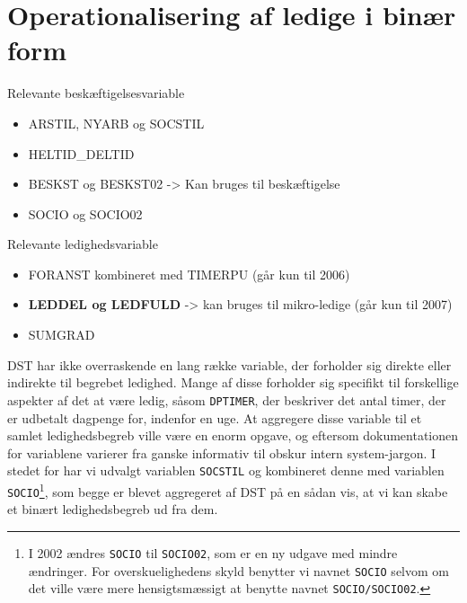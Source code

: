 \section{Operationalisering af ledige i binær form \label{ledig_operationalisering}} 
% 
Relevante beskæftigelsesvariable
 \begin{itemize} [topsep=6pt,itemsep=-1ex]
   \item ARSTIL, NYARB og SOCSTIL
   \item HELTID\_DELTID
   \item BESKST og BESKST02 -> Kan bruges til beskæftigelse
   \item SOCIO og SOCIO02
 \end{itemize}
% 
Relevante ledighedsvariable
 \begin{itemize} [topsep=6pt,itemsep=-1ex]
   \item FORANST kombineret med TIMERPU (går kun til 2006)
   \item \textbf{LEDDEL og LEDFULD} -> kan bruges til mikro-ledige (går kun til 2007)
   \item SUMGRAD
 \end{itemize}
% 


DST har ikke overraskende en lang række variable, der forholder sig direkte eller indirekte til begrebet ledighed. Mange af disse forholder sig specifikt til forskellige aspekter af det at være ledig, såsom \texttt{DPTIMER}, der beskriver det antal timer, der er udbetalt dagpenge for, indenfor en uge. At aggregere disse variable til et samlet ledighedsbegreb ville være en enorm opgave, og eftersom dokumentationen for variablene varierer fra ganske informativ til obskur intern system-jargon. I stedet for har vi udvalgt variablen \texttt{SOCSTIL} og kombineret denne med variablen \texttt{SOCIO}\footnote{I 2002 ændres \texttt{SOCIO} til \texttt{SOCIO02}, som er en ny udgave med mindre ændringer. For overskuelighedens skyld benytter vi navnet \texttt{SOCIO} selvom om det ville være mere hensigtsmæssigt at benytte navnet \texttt{SOCIO/SOCIO02}.}, som begge er blevet aggregeret af DST på en sådan vis, at vi kan skabe et binært ledighedsbegreb ud fra dem.

